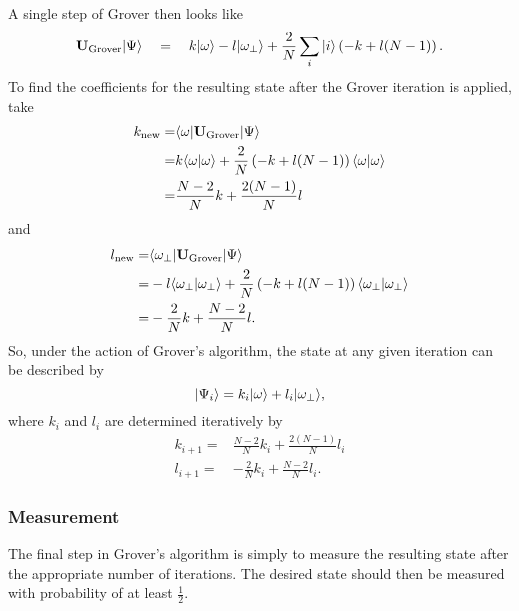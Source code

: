 A single step of Grover then looks like
\begin{equation}
{\bf U}_{\text{Grover}}{|{\Psi}\rangle}
\quad =\quad 
                k{|{\omega}\rangle} - l{|{\omega_\perp}\rangle}
                + \frac{2}{N} \sum_i {|{i}\rangle} \left(
                                    - k + l(N-1)
                              \right).
\end{equation}
To find the coefficients for the resulting state after 
the Grover iteration is applied, take
\begin{equation}
\begin{split}
k_{\text{new}} =& {\langle{\omega}|}{\bf U}_{\text{Grover}}{|{\Psi}\rangle}\\
=& k{\langle{\omega}|{\omega}\rangle} + \frac{2}{N} \left( -k + l(N-1) \right)
{\langle{\omega}|{\omega}\rangle}\\
=& \frac{N-2}{N}k + \frac{2(N-1)}{N}l
\end{split}
\end{equation}
and 
\begin{equation}
\begin{split}
l_{\text{new}} =& {\langle{\omega_\perp}|}{\bf U}_{\text{Grover}}{|{\Psi}\rangle}\\
=& -l{\langle{\omega_\perp}|{\omega_\perp}\rangle}
+ \frac{2}{N} \left( -k + l(N-1) \right) {\langle{\omega_\perp}|{\omega_\perp}\rangle}\\
=& -\frac{2}{N}k + \frac{N-2}{N}l.
\end{split}
\end{equation}
So, under the action of Grover's algorithm, the state at any given
iteration can be described by
\begin{equation}
{|{\Psi_i}\rangle} = k_i{|{\omega}\rangle} + l_i{|{\omega_\perp}\rangle},
\end{equation}
where $k_i$ and $l_i$ are determined iteratively by
\begin{equation}
\begin{split}
k_{i+1} =& \frac{N-2}{N}k_i + \frac{2(N-1)}{N}l_i\\
l_{i+1} =& -\frac{2}{N}k_i + \frac{N-2}{N}l_i.
\end{split}
\end{equation}

                
\subsubsection{Measurement}

The final step in Grover's algorithm is simply to measure the
resulting state after the appropriate number of iterations.
The desired state should then be measured with probability of at
least $\frac{1}{2}$.

